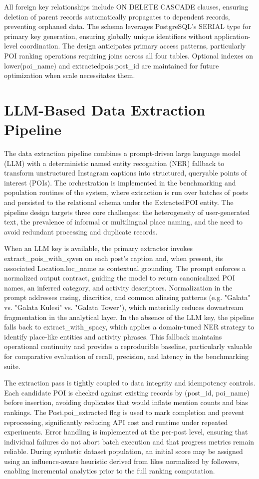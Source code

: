 \documentclass[a4paper,12pt]{report}
\begin{document}
All foreign key relationships include ON DELETE CASCADE clauses, ensuring deletion of parent records automatically propagates to dependent records, preventing orphaned data. The schema leverages PostgreSQL's SERIAL type for primary key generation, ensuring globally unique identifiers without application-level coordination. The design anticipates primary access patterns, particularly POI ranking operations requiring joins across all four tables. Optional indexes on lower(poi\_name) and extractedpois.post\_id are maintained for future optimization when scale necessitates them.

\section{LLM-Based Data Extraction Pipeline}

The data extraction pipeline combines a prompt-driven large language model (LLM) with a deterministic named entity recognition (NER) fallback to transform unstructured Instagram captions into structured, queryable points of interest (POIs). The orchestration is implemented in the benchmarking and population routines of the system, where extraction is run over batches of posts and persisted to the relational schema under the ExtractedPOI entity. The pipeline design targets three core challenges: the heterogeneity of user-generated text, the prevalence of informal or multilingual place naming, and the need to avoid redundant processing and duplicate records.

When an LLM key is available, the primary extractor invokes extract\_pois\_with\_qwen on each post’s caption and, when present, its associated Location.loc\_name as contextual grounding. The prompt enforces a normalized output contract, guiding the model to return canonicalized POI names, an inferred category, and activity descriptors. Normalization in the prompt addresses casing, diacritics, and common aliasing patterns (e.g. "Galata" vs. "Galata Kulesi" vs. "Galata Tower"), which materially reduces downstream fragmentation in the analytical layer. In the absence of the LLM key, the pipeline falls back to extract\_with\_spacy, which applies a domain-tuned NER strategy to identify place-like entities and activity phrases. This fallback maintains operational continuity and provides a reproducible baseline, particularly valuable for comparative evaluation of recall, precision, and latency in the benchmarking suite.

The extraction pass is tightly coupled to data integrity and idempotency controls. Each candidate POI is checked against existing records by (post\_id, poi\_name) before insertion, avoiding duplicates that would inflate mention counts and bias rankings. The Post.poi\_extracted flag is used to mark completion and prevent reprocessing, significantly reducing API cost and runtime under repeated experiments. Error handling is implemented at the per-post level, ensuring that individual failures do not abort batch execution and that progress metrics remain reliable. During synthetic dataset population, an initial score may be assigned using an influence-aware heuristic derived from likes normalized by followers, enabling incremental analytics prior to the full ranking computation.
\end{document}
